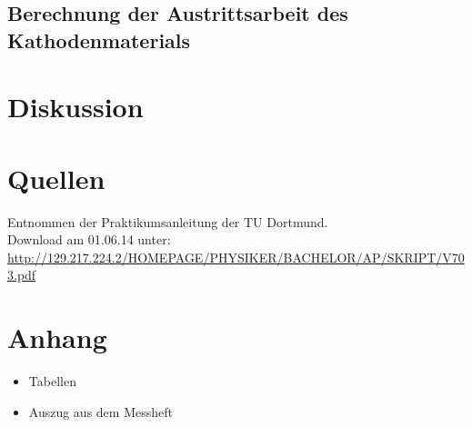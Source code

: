\documentclass[11pt,ngerman,a4paper]{article}
\begin{document}
\subsection{Berechnung der Austrittsarbeit des Kathodenmaterials}
\section{Diskussion}

\section{Quellen}
\begin{enumerate}[{[}1{]}]
\item Entnommen der Praktikumsanleitung \textit{} der TU Dortmund. \\
Download am 01.06.14 unter:\\
 \url{http://129.217.224.2/HOMEPAGE/PHYSIKER/BACHELOR/AP/SKRIPT/V703.pdf}
\end{enumerate}

\section{Anhang}
\begin{itemize}
\item Tabellen
\item Auszug aus dem Messheft
\end{itemize}
\end{document}
